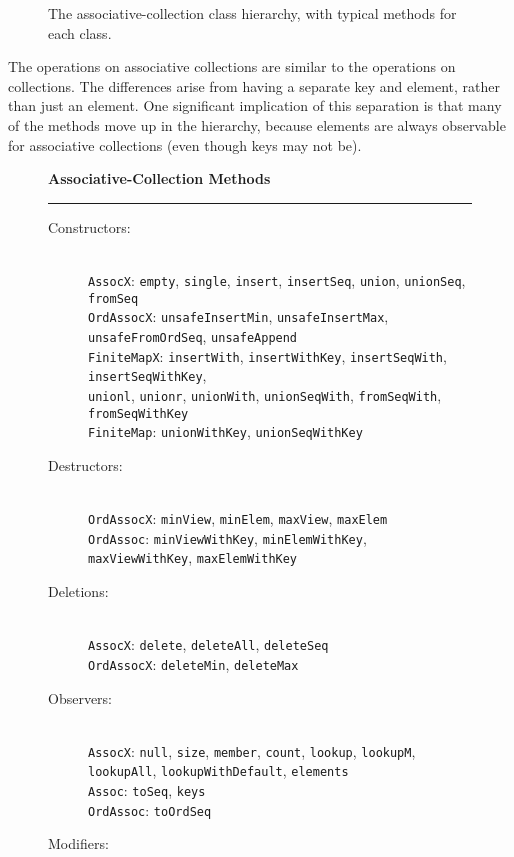 \documentclass{report}
\newcommand{\cd}{\texttt}
\newcommand{\nl}{\hspace*{0pt}\\}
\begin{document}
\begin{figure}
\normalsize

\caption{The associative-collection class hierarchy, with typical methods for each class.}
\label{assoc-hierarchy}
\end{figure}

The operations on associative collections are similar to the operations
on collections.  The differences arise from having a separate key and
element, rather than just an element.  One significant implication
of this separation is that many of the methods move up in the
hierarchy, because elements are always observable for associative
collections (even though keys may not be).

\begin{figure}
\begin{center}
\large\bfseries Associative-Collection Methods
\end{center}
\hrule
\begin{description}
\item[Constructors:] \nl
\cd{AssocX}: \cd{empty}, \cd{single}, \cd{insert}, \cd{insertSeq}, \cd{union}, \cd{unionSeq}, \cd{fromSeq} \\
\cd{OrdAssocX}: \cd{unsafeInsertMin}, \cd{unsafeInsertMax}, \cd{unsafeFromOrdSeq}, \cd{unsafeAppend} \\
\cd{FiniteMapX}: \cd{insertWith}, \cd{insertWithKey}, \cd{insertSeqWith}, \cd{insertSeqWithKey}, \\
  \hspace*{20pt}
  \cd{unionl}, \cd{unionr}, \cd{unionWith}, \cd{unionSeqWith}, \cd{fromSeqWith}, \cd{fromSeqWithKey} \\
\cd{FiniteMap}: \cd{unionWithKey}, \cd{unionSeqWithKey}
\item[Destructors:] \nl
\cd{OrdAssocX}: \cd{minView}, \cd{minElem}, \cd{maxView}, \cd{maxElem} \\
\cd{OrdAssoc}: \cd{minViewWithKey}, \cd{minElemWithKey}, \cd{maxViewWithKey}, \cd{maxElemWithKey}
\item[Deletions:] \nl
\cd{AssocX}: \cd{delete}, \cd{deleteAll}, \cd{deleteSeq} \\
\cd{OrdAssocX}: \cd{deleteMin}, \cd{deleteMax}
\item[Observers:] \nl
\cd{AssocX}: \cd{null}, \cd{size}, \cd{member}, \cd{count}, \cd{lookup}, \cd{lookupM}, \cd{lookupAll}, \cd{lookupWithDefault}, \cd{elements} \\
\cd{Assoc}: \cd{toSeq}, \cd{keys} \\
\cd{OrdAssoc}: \cd{toOrdSeq}
\item[Modifiers:] \nl

\end{description}
\end{figure}
\end{document}
